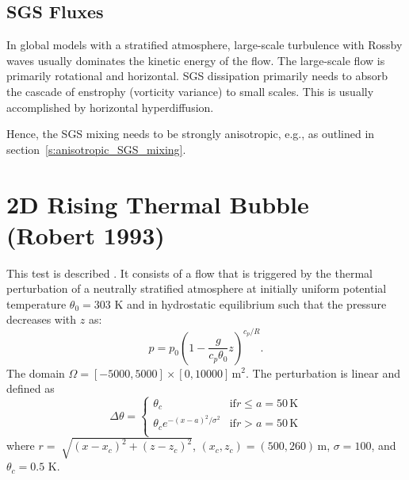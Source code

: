\documentclass{report}
\begin{document}
\subsection{SGS Fluxes}

In global models with a stratified atmosphere, large-scale turbulence with Rossby waves usually dominates the kinetic energy of the flow. The large-scale flow is primarily rotational and horizontal. SGS dissipation primarily needs to absorb the cascade of enstrophy (vorticity variance) to small scales. This is usually accomplished by horizontal hyperdiffusion.

Hence, the SGS mixing needs to be strongly anisotropic, e.g., as outlined in section~\ref{s:anisotropic_SGS_mixing}.

\section{2D Rising Thermal Bubble (Robert 1993)}
\label{2dRTBtest}
This test is described \cite{robert1993}. It consists of a flow that is triggered by the thermal perturbation of a neutrally stratified atmosphere at initially uniform potential temperature $\theta_0 = 303$ K
and in hydrostatic equilibrium such that the pressure decreases with $z$ as:
\begin{equation}
\label{pressureDistrib}
p = p_{0}\left(1-\frac{g}{c_p{\theta_{0}}}z\right)^{c_p/R}.
\end{equation}
The domain $\Omega=[-5000,5000]\times[0,10000]\,\mathrm{m}^2$.
The perturbation is linear and defined as
\begin{equation}
 \Delta\theta = \left\{ \begin{array}{ll}
 \theta_c & \mathrm{if } r \leq a=50\,{\mathrm K}\\
 \theta_c e^{-(x - a)^2/\sigma^2} & \mathrm{if } r > a=50\,{\mathrm K}\\
\end{array} \right.
\label{eq:robertIni}
\end{equation}
where $r = \sqrt[]{(x-x_{c})^{2} + (z-z_{c})^{2}}$, $(x_c,z_c) = (500,260)\,\mathrm{m}$, $\sigma = 100$, and $\theta_c=0.5$ K.
\end{document}

